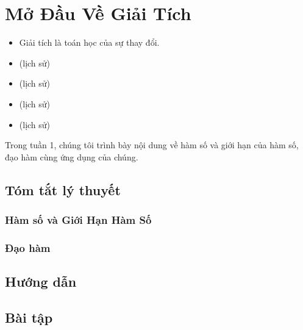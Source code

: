   
\chapter{Mở Đầu Về Giải Tích}

\begin{itemize}
    \item Giải tích là toán học của sự thay đổi.

    \item (lịch sử)

    \item (lịch sử)

    \item (lịch sử)
    \item (lịch sử)

\end{itemize}
\noindent Trong tuần 1, chúng tôi trình bày nội dung về hàm số và giới hạn của hàm số, đạo hàm cùng ứng dụng của chúng.
\newpage
\section{Tóm tắt lý thuyết}
\subsection{Hàm số và Giới Hạn Hàm Số}

\subsection{Đạo hàm}

\section{Hướng dẫn}
\section{Bài tập}

